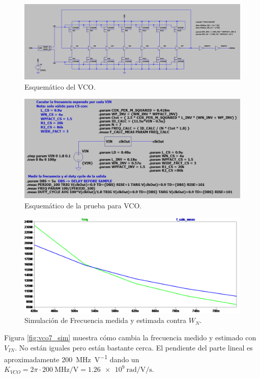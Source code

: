 \documentclass[a4paper]{article}
\begin{document}
\begin{figure}[!htb]
\centering
\includegraphics[scale=0.4]{./img/vco7_sch}
\caption{Esquemático del VCO.}
\label{fig:vco7_sch}
\end{figure}

\begin{figure}[!htb]
\centering
\includegraphics[scale=0.4]{./img/vco7_test_sch}
\caption{Esquemático de la prueba para VCO.}
\label{fig:vco7_test_sch}
\end{figure}

\begin{figure}[!htb]
\centering
\includegraphics[scale=0.4]{./img/vco7_sim_wn}
\caption{Simulación de Frecuencia medida y estimada contra $W_N$.}
\label{fig:vco7_sim_wn}
\end{figure}

Figura \ref{fig:vco7_sim} muestra cómo cambia la frecuencia medido y estimado con $V_{IN}$. No están iguales pero están bastante cerca. El pendiente del parte lineal es aproximadamente \SI[per-mode=symbol]{200}{\mega\hertz\per\volt} dando un $K_{VCO} = 2\pi \cdot \SI[per-mode=symbol]{200}{\mega\hertz\per\volt} = \SI[per-mode=symbol]{1.26e9}{\radian\per\volt\per\second}$.
\end{document}
